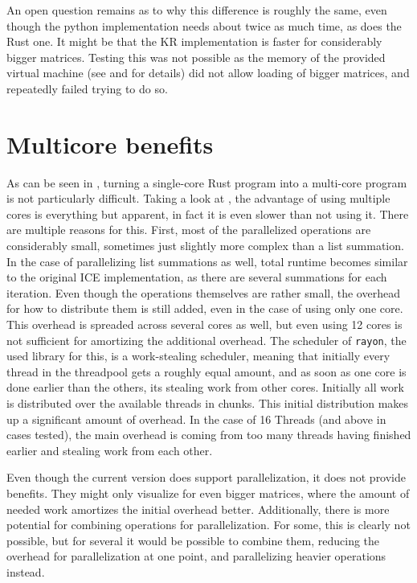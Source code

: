 An open question remains as to why this difference is roughly the same, even
though the python implementation needs about twice as much time, as does the
Rust one. It might be that the KR implementation is faster for considerably
bigger matrices. Testing this was not possible as the memory of the provided
virtual machine (see  and  for details)
did not allow loading of bigger matrices, and repeatedly failed trying to do
so.



\section{Multicore benefits}\label{sec:multicore}



As can be seen in , turning a single-core Rust program into
a multi-core program is not particularly difficult. Taking a look at
, the advantage of using multiple cores is everything
but apparent, in fact it is even slower than not using it. There are multiple
reasons for this. First, most of the parallelized operations are considerably
small, sometimes just slightly more complex than a list summation. In the case
of parallelizing list summations as well, total runtime becomes similar to the
original ICE implementation, as there are several summations for each
iteration. Even though the operations themselves are rather small, the overhead
for how to distribute them is still added, even in the case of using only one
core. This overhead is spreaded across several cores as well, but even using 12
cores is not sufficient for amortizing the additional overhead. The scheduler
of \verb|rayon|, the used library for this, is a work-stealing scheduler,
meaning that initially every thread in the threadpool gets a roughly equal
amount, and as soon as one core is done earlier than the others, its stealing
work from other cores. Initially all work is distributed over the available
threads in chunks. This initial distribution makes up a significant amount of
overhead. In the case of 16 Threads (and above in cases tested), the main
overhead is coming from too many threads having finished earlier and stealing
work from each other.

Even though the current version does support parallelization, it does not
provide benefits. They might only visualize for even bigger matrices, where the
amount of needed work amortizes the initial overhead better. Additionally,
there is more potential for combining operations for parallelization. For some,
this is clearly not possible, but for several it would be possible to combine
them, reducing the overhead for parallelization at one point, and parallelizing
heavier operations instead.

